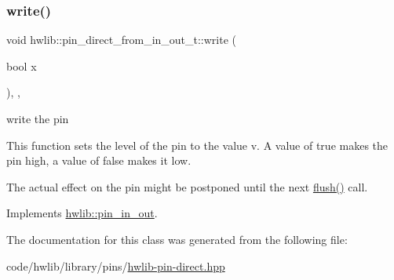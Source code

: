 \subsubsection{\texorpdfstring{write()}{write()}}
{\footnotesize\ttfamily void hwlib\+::pin\+\_\+direct\+\_\+from\+\_\+in\+\_\+out\+\_\+t\+::write (\begin{DoxyParamCaption}\item[{bool}]{x }\end{DoxyParamCaption})\hspace{0.3cm}{\ttfamily [inline]}, {\ttfamily [override]}, {\ttfamily [virtual]}}

write the pin

This function sets the level of the pin to the value v. A value of true makes the pin high, a value of false makes it low.

The actual effect on the pin might be postponed until the next \hyperlink{classhwlib_1_1pin__direct__from__in__out__t_a4c67e73e0fa9ac4e9a2c5917537eb98a}{flush()} call. 

Implements \hyperlink{classhwlib_1_1pin__in__out_aa5e2adcb5707f86c20b6306fc09f1582}{hwlib\+::pin\+\_\+in\+\_\+out}.



The documentation for this class was generated from the following file\+:\begin{DoxyCompactItemize}
\item 
code/hwlib/library/pins/\hyperlink{hwlib-pin-direct_8hpp}{hwlib-\/pin-\/direct.\+hpp}\end{DoxyCompactItemize}
